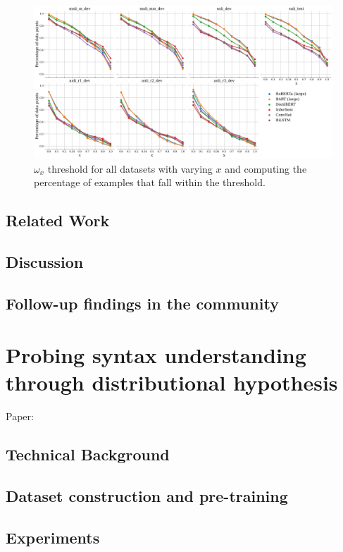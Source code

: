 \documentclass[letterpaper, 12pt]{report}
\begin{document}
\begin{figure}[htbp]
\centering
\includegraphics[width=.9\linewidth]{figs/unli/omega_threshold.png}
\caption{\(\omega_{x}\) threshold for all datasets with varying \(x\) and computing the percentage of examples that fall within the threshold.}
\end{figure}



\section{Related Work}
\label{sec:orgb553052}
\section{Discussion}
\label{sec:org6975f27}
\section{Follow-up findings in the community}
\label{sec:orgb976e8a}

\clearpage
\chapter{Probing syntax understanding through distributional hypothesis}
\label{sec:orgcdbaaa6}

Paper: \cite{sinha2021}

\section{Technical Background}
\label{sec:orgcfd03af}
\section{Dataset construction and pre-training}
\label{sec:orgc115e76}
\section{Experiments}
\label{sec:orgbbc65e2}
\end{document}
